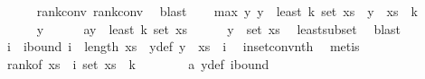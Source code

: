 \begin{isabellebody}
\ \ \ \ \isamarkupfalse%
\ rank{\isacharunderscore}{\kern0pt}conv{\isacharunderscore}{\kern0pt}{}\ rank{\isacharunderscore}{\kern0pt}conv{\isacharunderscore}{\kern0pt}{}\ \isamarkupfalse%
\ blast\isanewline
\isanewline
\ \ \isamarkupfalse%
\ max{\isacharunderscore}{\kern0pt}{}{\isacharcolon}{\kern0pt}\ {\isachardoublequoteopen}{\isasymAnd}y{\isachardot}{\kern0pt}\ y\ {\isasymin}\ least\ {\isacharparenleft}{\kern0pt}k{\isacharplus}{\kern0pt}{}{\isacharparenright}{\kern0pt}\ {\isacharparenleft}{\kern0pt}set\ xs{\isacharparenright}{\kern0pt}\ {\isasymLongrightarrow}\ y\ {\isasymle}\ xs\ {\isacharbang}{\kern0pt}\ k{\isachardoublequoteclose}\ \isanewline
\ \ \isamarkupfalse%
\ {\isacharminus}{\kern0pt}\isanewline
\ \ \ \ \isamarkupfalse%
\ y\isanewline
\ \ \ \ \isamarkupfalse%
\ a{\isacharcolon}{\kern0pt}{\isachardoublequoteopen}y\ {\isasymin}\ least\ {\isacharparenleft}{\kern0pt}k{\isacharplus}{\kern0pt}{}{\isacharparenright}{\kern0pt}\ {\isacharparenleft}{\kern0pt}set\ xs{\isacharparenright}{\kern0pt}{\isachardoublequoteclose}\isanewline
\ \ \ \ \isamarkupfalse%
\ {\isachardoublequoteopen}y\ {\isasymin}\ set\ xs{\isachardoublequoteclose}\ \isamarkupfalse%
\ least{\isacharunderscore}{\kern0pt}subset\ \isamarkupfalse%
\ blast\isanewline
\ \ \ \ \isamarkupfalse%
\ \isamarkupfalse%
\ i\ \ i{\isacharunderscore}{\kern0pt}bound{\isacharcolon}{\kern0pt}\ {\isachardoublequoteopen}i\ {\isacharless}{\kern0pt}\ length\ xs{\isachardoublequoteclose}\ \ y{\isacharunderscore}{\kern0pt}def{\isacharcolon}{\kern0pt}\ {\isachardoublequoteopen}y\ {\isacharequal}{\kern0pt}\ xs\ {\isacharbang}{\kern0pt}\ i{\isachardoublequoteclose}\ \isamarkupfalse%
\ in{\isacharunderscore}{\kern0pt}set{\isacharunderscore}{\kern0pt}conv{\isacharunderscore}{\kern0pt}nth\ \isamarkupfalse%
\ metis\isanewline
\ \ \ \ \isamarkupfalse%
\ {\isachardoublequoteopen}rank{\isacharunderscore}{\kern0pt}of\ {\isacharparenleft}{\kern0pt}xs\ {\isacharbang}{\kern0pt}\ i{\isacharparenright}{\kern0pt}\ {\isacharparenleft}{\kern0pt}set\ xs{\isacharparenright}{\kern0pt}\ {\isacharless}{\kern0pt}\ k{\isacharplus}{\kern0pt}{}{\isachardoublequoteclose}\isanewline
\ \ \ \ \ \ \isamarkupfalse%
\ a\ y{\isacharunderscore}{\kern0pt}def\ i{\isacharunderscore}{\kern0pt}bound\ \isamarkupfalse%

\end{isabellebody}
